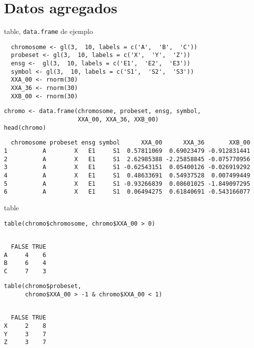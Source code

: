 \documentclass[xcolor={usenames,svgnames,dvipsnames}]{beamer}
\begin{document}
\section{Datos agregados}
\label{sec-3}
\begin{frame}[fragile,label=sec-3-1]{table, \texttt{data.frame} de ejemplo}
 \lstset{language=R,label= ,caption= ,numbers=none}
\begin{lstlisting}
  chromosome <- gl(3,  10, labels = c('A',  'B',  'C'))
  probeset <- gl(3,  10, labels = c('X',  'Y',  'Z'))
  ensg <-  gl(3,  10, labels = c('E1',  'E2',  'E3'))
  symbol <- gl(3,  10, labels = c('S1',  'S2',  'S3'))
  XXA_00 <- rnorm(30)
  XXA_36 <- rnorm(30)
  XXB_00 <- rnorm(30)
\end{lstlisting}

\lstset{language=R,label= ,caption= ,numbers=none}
\begin{lstlisting}
chromo <- data.frame(chromosome, probeset, ensg, symbol,
                     XXA_00, XXA_36, XXB_00)
head(chromo)
\end{lstlisting}

\begin{verbatim}
  chromosome probeset ensg symbol      XXA_00      XXA_36       XXB_00
1          A        X   E1     S1  0.57811069  0.69023479 -0.912831441
2          A        X   E1     S1  2.62985388 -2.25858845 -0.075770956
3          A        X   E1     S1 -0.62543151  0.05400126 -0.026919292
4          A        X   E1     S1  0.48633691  0.54937528  0.007499449
5          A        X   E1     S1 -0.93266839  0.08601025 -1.849097295
6          A        X   E1     S1  0.06494275  0.61840691 -0.543166077
\end{verbatim}
\end{frame}

\begin{frame}[fragile,label=sec-3-2]{table}
 \lstset{language=R,label= ,caption= ,numbers=none}
\begin{lstlisting}
table(chromo$chromosome, chromo$XXA_00 > 0)
\end{lstlisting}

\begin{verbatim}
 
  FALSE TRUE
A     4    6
B     6    4
C     7    3
\end{verbatim}

\lstset{language=R,label= ,caption= ,numbers=none}
\begin{lstlisting}
table(chromo$probeset,
      chromo$XXA_00 > -1 & chromo$XXA_00 < 1)
\end{lstlisting}

\begin{verbatim}
 
  FALSE TRUE
X     2    8
Y     3    7
Z     3    7
\end{verbatim}
\end{frame}
\end{document}
